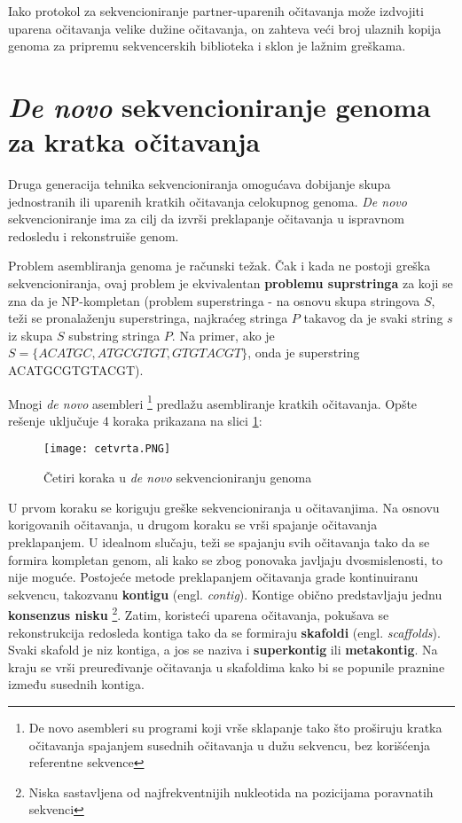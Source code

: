 \documentclass[12pt,oneside]{memoir}
\begin{document}
Iako protokol za sekvencioniranje partner-uparenih očitavanja može izdvojiti uparena očitavanja velike dužine očitavanja, on zahteva veći broj ulaznih kopija genoma za pripremu sekvencerskih biblioteka i sklon je lažnim greškama.

\section{\textit{De novo} sekvencioniranje genoma za kratka očitavanja}

Druga generacija tehnika sekvencioniranja omogućava dobijanje skupa jednostranih ili uparenih kratkih očitavanja celokupnog genoma. \textit{De novo} sekvencioniranje ima za cilj da izvrši preklapanje očitavanja u ispravnom redosledu i rekonstruiše genom.

Problem asembliranja genoma je računski težak. Čak i kada ne postoji greška sekvencioniranja, ovaj problem je ekvivalentan \textbf{problemu suprstringa} za koji se zna da je NP-kompletan (problem superstringa - na osnovu skupa stringova $S$, teži se pronalaženju superstringa, najkraćeg stringa $P$ takavog da je svaki string $s$ iz skupa $S$ substring stringa $P$. Na primer, ako je $S = \{ACATGC, ATGCGTGT, GTGTACGT\}$, onda je superstring ACATGCGTGTACGT).

Mnogi \textit{de novo} asembleri \footnote{De novo asembleri su programi
koji vrše sklapanje tako što proširuju kratka očitavanja spajanjem susednih
očitavanja u dužu sekvencu, bez korišćenja referentne sekvence} predlažu asembliranje kratkih očitavanja. Opšte rešenje uključuje 4 koraka prikazana na slici \ref{fig:4}:

\begin{figure}[!ht]
  \centering
  \texttt{[image: cetvrta.PNG]}
  \caption{Četiri koraka u \textit{de novo} sekvencioniranju genoma}
  \label{fig:4}
\end{figure}

U prvom koraku se koriguju greške sekvencioniranja u očitavanjima. Na osnovu korigovanih očitavanja, u drugom koraku se vrši spajanje očitavanja preklapanjem. U idealnom slučaju, teži se spajanju svih očitavanja tako da se formira kompletan genom, ali kako se zbog ponovaka javljaju dvosmislenosti, to nije moguće. Postojeće metode preklapanjem očitavanja grade kontinuiranu sekvencu, takozvanu \textbf{kontigu} (engl. \textit{contig}). Kontige obično predstavljaju jednu \textbf{konsenzus nisku} \footnote{Niska sastavljena od najfrekventnijih nukleotida na pozicijama poravnatih sekvenci}. Zatim, koristeći uparena očitavanja, pokušava se rekonstrukcija redosleda kontiga tako da se formiraju \textbf{skafoldi} (engl. \textit{scaffolds}). Svaki skafold je niz kontiga, a jos se naziva i \textbf{superkontig} ili \textbf{metakontig}. Na kraju se vrši preuređivanje očitavanja u skafoldima kako bi se popunile praznine između susednih kontiga.
\end{document}
